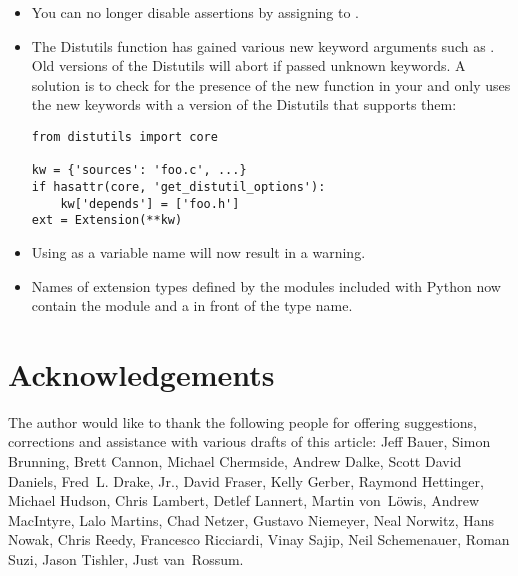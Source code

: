 \documentclass{howto}
\begin{document}
\begin{itemize}
\item You can no longer disable assertions by assigning to .

\item The Distutils  function has gained various new
keyword arguments such as .  Old versions of the
Distutils will abort if passed unknown keywords.  A solution is to check
for the presence of the new  function
in your  and only uses the new keywords
with a version of the Distutils that supports them:

\begin{verbatim}
from distutils import core

kw = {'sources': 'foo.c', ...}
if hasattr(core, 'get_distutil_options'):
    kw['depends'] = ['foo.h']
ext = Extension(**kw)
\end{verbatim}

\item Using  as a variable name will now result in a
 warning.

\item Names of extension types defined by the modules included with
Python now contain the module and a  in front of the type
name.

\end{itemize}


\section{Acknowledgements \label{acks}}

The author would like to thank the following people for offering
suggestions, corrections and assistance with various drafts of this
article: Jeff Bauer, Simon Brunning, Brett Cannon, Michael Chermside,
Andrew Dalke, Scott David Daniels, Fred~L. Drake, Jr., David Fraser,
Kelly Gerber,
Raymond Hettinger, Michael Hudson, Chris Lambert, Detlef Lannert,
Martin von~L\"owis, Andrew MacIntyre, Lalo Martins, Chad Netzer,
Gustavo Niemeyer, Neal Norwitz, Hans Nowak, Chris Reedy, Francesco
Ricciardi, Vinay Sajip, Neil Schemenauer, Roman Suzi, Jason Tishler,
Just van~Rossum.
\end{document}
